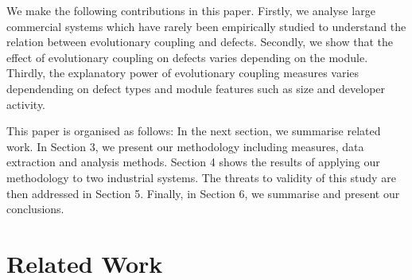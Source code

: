 \documentclass[times]{smrauth}
\begin{document}
We make the following contributions in this paper. Firstly, we analyse large commercial systems which have rarely been empirically studied to understand the relation between evolutionary coupling and defects. Secondly, we show that the effect of evolutionary coupling on defects varies depending on the module. Thirdly, the explanatory power of evolutionary coupling measures varies dependending on defect types and module features such as size and developer activity.

This paper is organised as follows: In the next section, we summarise related work. In Section 3, we present our methodology including measures, data extraction and analysis methods. Section 4 shows the results of applying our methodology to two industrial systems. The threats to validity of this study are then addressed in Section 5. Finally, in Section 6, we summarise and present our conclusions.

%
%
%

\section{Related Work}

\end{document}
